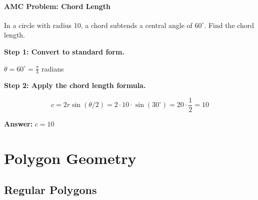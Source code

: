 ﻿\documentclass[12pt]{extarticle}
\begin{document}
\paragraph{AMC Problem: Chord Length}

In a circle with radius 10, a chord subtends a central angle of $60^{\circ}$. Find the chord length.

\begin{solutionbox}
\textbf{Step 1: Convert to standard form.}

$\theta = 60^{\circ} = \frac{\pi}{3}$ radians

\textbf{Step 2: Apply the chord length formula.}

\[c = 2r\sin(\theta/2) = 2 \cdot 10 \cdot \sin(30^{\circ}) = 20 \cdot \frac{1}{2} = 10\]

\textbf{Answer:} $\boxed{c = 10}$
\end{solutionbox}

\section{Polygon Geometry}

\subsection{Regular Polygons}
\end{document}
